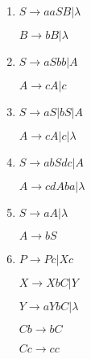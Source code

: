 \begin{question}

\begin{enumerate}[label=\textbf{\alph*})]
  \item 
  $S \rightarrow aaSB | \lambda$
  
  $B \rightarrow bB | \lambda$
  
  \item 
  $S \rightarrow aSbb | A$
  
  $A \rightarrow cA | c$
  
  \item 
  $S \rightarrow aS | bS | A $
  
  $A \rightarrow cA | c | \lambda $
  
  \item 
  $S \rightarrow abSdc | A $
  
  $A \rightarrow cdAba | \lambda$
  
  \item 
  $S \rightarrow aA | \lambda$
  
  $A \rightarrow bS $
  
  \item 
  $P \rightarrow Pc | Xc $
  
  $X \rightarrow XbC | Y $
  
  $Y \rightarrow aYbC | \lambda $
  
  $Cb \rightarrow bC $
  
  $Cc \rightarrow cc $
  
\end{enumerate}
  
\end{question}
